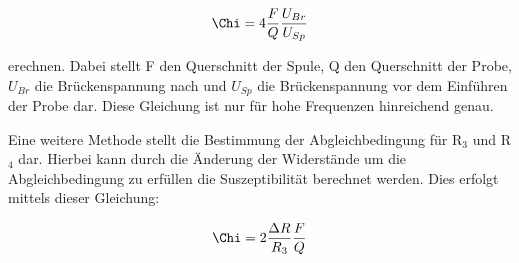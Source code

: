 \begin{equation}
  \Chi = 4 \frac{F}{Q} \frac{U_{Br}}{U_{Sp}}
\end{equation}

erechnen.
Dabei stellt F den Querschnitt der Spule, Q den Querschnitt der Probe, $U_{Br}$ die Brückenspannung nach und $U_{Sp}$ die Brückenspannung vor dem Einführen der Probe dar.
Diese Gleichung ist nur für hohe Frequenzen hinreichend genau.

Eine weitere Methode stellt die Bestimmung der Abgleichbedingung für R$_3$ und R$_4$ dar.
Hierbei kann durch die Änderung der Widerstände um die Abgleichbedingung zu erfüllen die Suszeptibilität berechnet werden.
Dies erfolgt mittels dieser Gleichung:

\begin{equation}
  \Chi = 2 \frac{\Delta R}{R_3} \frac{F}{Q}
\end{equation}
